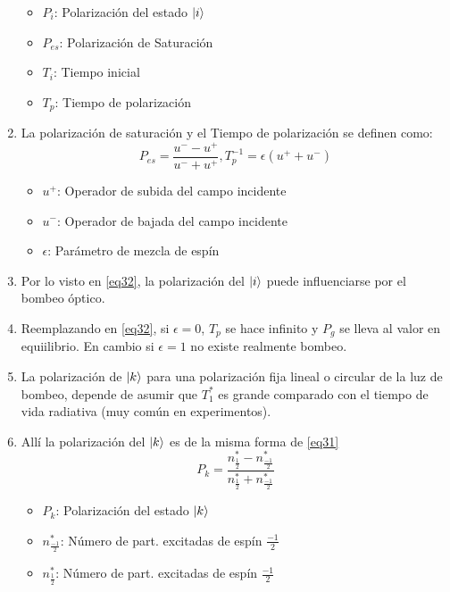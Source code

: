 \documentclass[aps,rmp,reprint,longbibliography]{revtex4-1}
\begin{document}
\begin{enumerate}
\begin{itemize}
    \item $P_i$: Polarización del estado $\ket{i}$
    \item $P_{es}$: Polarización de Saturación
    \item $T_i$: Tiempo inicial
    \item $T_p$: Tiempo de polarización
\end{itemize}
\item La polarización de saturación y el Tiempo de polarización se definen como:
\begin{equation}\label{eq32}P_{es}=\frac{u^--u^+}{u^-+u^+}, T_p^{-1}=\epsilon(u^++u^-)\end{equation}
\begin{itemize}
    \item $u^+$: Operador de subida del campo incidente
    \item $u^-$: Operador de bajada del campo incidente
    \item $\epsilon$: Parámetro de mezcla de espín
\end{itemize}
\item Por lo visto en \ref{eq32}, la polarización del $\ket{i}$ puede influenciarse por el bombeo óptico. 
\item Reemplazando en \ref{eq32}, si $\epsilon=0$, $T_p$ se hace infinito y $P_g$ se lleva al valor en equiilibrio. En cambio si $\epsilon = 1 $ no existe realmente bombeo.
\item La polarización de $\ket{k}$ para una polarización fija lineal o circular de la luz de bombeo, depende de asumir que $T_1^*$ es grande comparado con el tiempo de vida radiativa (muy común en experimentos). 
\item Allí la polarización del $\ket{k}$ es de la misma forma de \ref{eq31}
\begin{equation}\label{eq33}P_{k}=\frac{n^*_{\frac{1}{2}}-n^*_{\frac{-1}{2}}}{n^*_{\frac{1}{2}}+n^*_{\frac{-1}{2}}}\end{equation}
\begin{itemize}
    \item $P_k$: Polarización del estado $\ket{k}$
    \item $n_{\frac{-1}{2}}^*$: Número de part. excitadas de espín $\frac{-1}{2}$
    \item $n_{\frac{1}{2}}^*$: Número de part. excitadas de espín $\frac{-1}{2}$
\end{itemize}


\end{enumerate}
\end{document}
